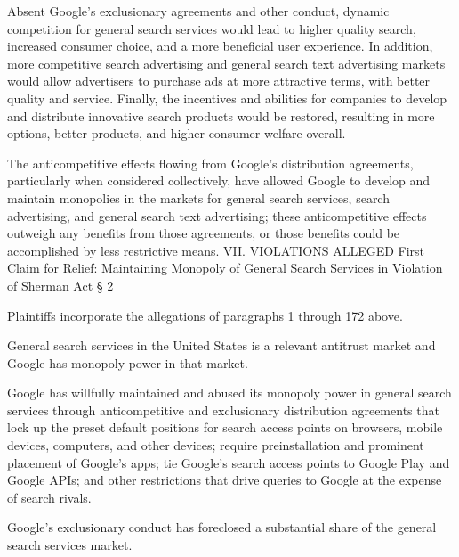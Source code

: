 \documentclass[11pt,b5paper]{scrartcl}
\begin{document}

Absent Google’s exclusionary agreements and other conduct, dynamic
competition for general search services would lead to higher quality search, increased consumer
choice, and a more beneficial user experience. In addition, more competitive search advertising
and general search text advertising markets would allow advertisers to purchase ads at more
attractive terms, with better quality and service. Finally, the incentives and abilities for
companies to develop and distribute innovative search products would be restored, resulting in
more options, better products, and higher consumer welfare overall.


The anticompetitive effects flowing from Google’s distribution agreements,
particularly when considered collectively, have allowed Google to develop and maintain
monopolies in the markets for general search services, search advertising, and general search text
advertising; these anticompetitive effects outweigh any benefits from those agreements, or those
benefits could be accomplished by less restrictive means.
VII.
VIOLATIONS ALLEGED
First Claim for Relief: Maintaining Monopoly of General Search Services in Violation of
Sherman Act § 2


Plaintiffs incorporate the allegations of paragraphs 1 through 172 above.


General search services in the United States is a relevant antitrust market and
Google has monopoly power in that market.


Google has willfully maintained and abused its monopoly power in general search
services through anticompetitive and exclusionary distribution agreements that lock up the preset
default positions for search access points on browsers, mobile devices, computers, and other
devices; require preinstallation and prominent placement of Google’s apps; tie Google’s search
access points to Google Play and Google APIs; and other restrictions that drive queries to
Google at the expense of search rivals.


Google’s exclusionary conduct has foreclosed a substantial share of the general
search services market.

\end{document}
